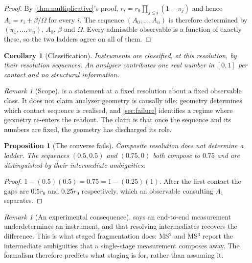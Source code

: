 \documentclass[11pt,a4paper]{article}
\theoremstyle{plain}
\newtheorem{proposition}[theorem]{Proposition}
\newtheorem{corollary}[theorem]{Corollary}
\theoremstyle{definition}
\theoremstyle{remark}
\newtheorem{remark}[theorem]{Remark}
\newcommand{\flo}{\beta}
\newcommand{\pow}{\pi}
\newcommand{\gap}{r}
\newcommand{\Tot}{\Omega}
\newcommand{\Amb}{A}
\begin{document}
\begin{proof}
By \cref{thm:multiplicative}'s proof, $\gap_i = \gap_0\prod_{j \le i}(1-\pow_j)$
and hence $\Amb_i = \gap_i + \flo/\Tot$ for every $i$. The sequence
$(\Amb_0,\dots,\Amb_n)$ is therefore determined by
$(\pow_1,\dots,\pow_n)$, $\Amb_0$, $\flo$ and $\Tot$. Every admissible
observable is a function of exactly these, so the two ladders agree on all of
them.
\end{proof}

\begin{corollary}[Classification]
\label{cor:classification}
Instruments are classified, at this resolution, by their resolution sequences.
An analyser contributes one real number in $[0,1]$ per contact and no structural
information.
\end{corollary}

\begin{remark}[Scope]
\label{rem:scope}
 is a statement at a fixed resolution about a fixed
observable class. It does not claim analyser geometry is causally idle: geometry
determines which contact sequence is realised, and \cref{sec:failure} identifies
a regime where geometry re-enters the readout. The claim is that once the
sequence and its numbers are fixed, the geometry has discharged its role.
\end{remark}

\begin{proposition}[The converse fails]
\label{prop:converse}
Composite resolution does not determine a ladder. The sequences $(0.5, 0.5)$ and
$(0.75, 0)$ both compose to $0.75$ and are distinguished by their intermediate
ambiguities.
\end{proposition}

\begin{proof}
$1-(0.5)(0.5) = 0.75 = 1-(0.25)(1)$. After the first contact the gaps are
$0.5\gap_0$ and $0.25\gap_0$ respectively, which an observable consulting
$\Amb_1$ separates.
\end{proof}

\begin{remark}[An experimental consequence]
\label{rem:mslevels}
 says an end-to-end measurement underdetermines an
instrument, and that resolving intermediates recovers the difference. This is
what staged fragmentation does: MS$^2$ and MS$^3$ report the intermediate
ambiguities that a single-stage measurement composes away. The formalism
therefore predicts what staging is for, rather than assuming it.
\end{remark}
\end{document}
